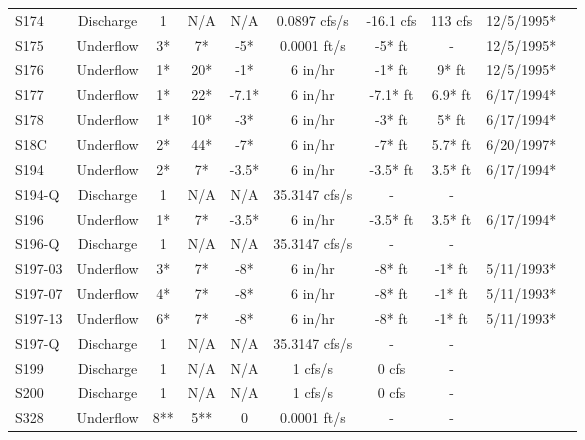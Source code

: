 \begin{table}[h]
\begin{tabular}{@{}lccccccccc@{}}
{S174}          & Discharge     & 1        & N/A         & N/A          & 0.0897 cfs/s   & -16.1 cfs       & 113 cfs & 12/5/1995*      \\
{S175}          & Underflow     & 3*       & 7*          & -5*          & 0.0001 ft/s    & -5* ft          & -       & 12/5/1995*      \\
{S176}          & Underflow     & 1*       & 20*         & -1*          & 6 in/hr        & -1* ft          & 9* ft   & 12/5/1995*      \\
{S177}          & Underflow     & 1*       & 22*         & -7.1*        & 6 in/hr        & -7.1* ft        & 6.9* ft & 6/17/1994*      \\
{S178}          & Underflow     & 1*       & 10*         & -3*          & 6 in/hr        & -3* ft          & 5* ft   & 6/17/1994*      \\
{S18C}          & Underflow     & 2*       & 44*         & -7*          & 6 in/hr        & -7* ft          & 5.7* ft & 6/20/1997*      \\
{S194}          & Underflow     & 2*       & 7*          & -3.5*        & 6 in/hr        & -3.5* ft        & 3.5* ft & 6/17/1994*      \\
{S194-Q}        & Discharge     & 1        & N/A         & N/A          & 35.3147 cfs/s  & -               & -       &                 \\
{S196}          & Underflow     & 1*       & 7*          & -3.5*        & 6 in/hr        & -3.5* ft        & 3.5* ft & 6/17/1994*      \\
{S196-Q}        & Discharge     & 1        & N/A         & N/A          & 35.3147 cfs/s  & -               & -       &                 \\
{S197-03}       & Underflow     & 3*       & 7*          & -8*          & 6 in/hr        & -8* ft          & -1* ft  & 5/11/1993*      \\
{S197-07}       & Underflow     & 4*       & 7*          & -8*          & 6 in/hr        & -8* ft          & -1* ft  & 5/11/1993*      \\
{S197-13}       & Underflow     & 6*       & 7*          & -8*          & 6 in/hr        & -8* ft          & -1* ft  & 5/11/1993*      \\
{S197-Q}        & Discharge     & 1        & N/A         & N/A          & 35.3147 cfs/s  & -               & -       &                 \\
{S199}          & Discharge     & 1        & N/A         & N/A          & 1 cfs/s        & 0 cfs           & -       &                 \\
{S200}          & Discharge     & 1        & N/A         & N/A          & 1 cfs/s        & 0 cfs           & -       &                 \\
{S328}          & Underflow     & 8**      & 5**         & 0            & 0.0001 ft/s    & -               & -       &                 \\
\hline
\end{tabular}


\end{table}

